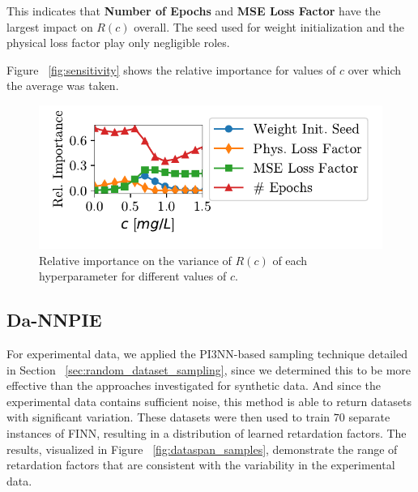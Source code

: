 This indicates that \textbf{Number of Epochs} and \textbf{MSE Loss Factor} have the largest impact on $R(c)$ overall. The seed used for weight initialization and the physical loss factor play only negligible roles.

Figure ~\vref{fig:sensitivity} shows the relative importance for values of $c$ over which the average was taken.

\begin{figure}[h]
    \centering
    \includegraphics{figs/sensitivity.pdf}
    \caption{Relative importance on the variance of $R(c)$ of each hyperparameter for different values of $c$.}
    \label{fig:sensitivity}
\end{figure}




\subsection{Da-NNPIE}
For experimental data, we applied the PI3NN-based sampling technique detailed in Section ~\vref{sec:random_dataset_sampling}, since we determined this to be more effective than the approaches investigated for synthetic data. And since the experimental data contains sufficient noise, this method is able to return datasets with significant variation.
These datasets were then used to train $70$ separate instances of FINN, resulting in a distribution of learned retardation factors. The results, visualized in Figure ~\vref{fig:dataspan_samples}, demonstrate the range of retardation factors that are consistent with the variability in the experimental data.


